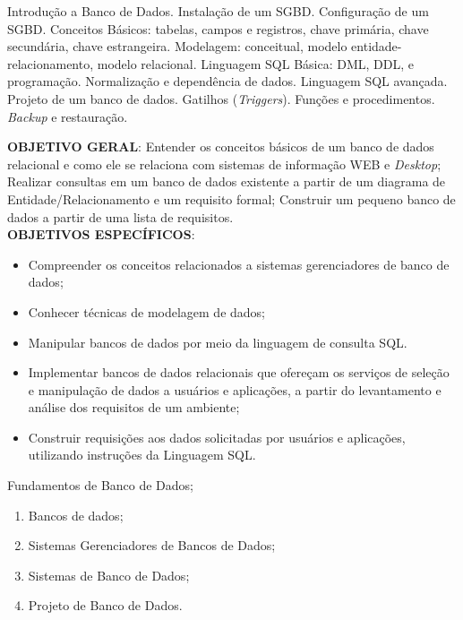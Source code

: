 
\begin{pud}

	
	
	\ementa
	Introdução a Banco de Dados. Instalação de um SGBD. Configuração de um SGBD. Conceitos Básicos: tabelas, campos e registros, chave primária, chave secundária, chave estrangeira. Modelagem: conceitual, modelo entidade-relacionamento, modelo relacional. Linguagem SQL Básica: DML, DDL, e programação. Normalização e dependência de dados. Linguagem SQL avançada. Projeto de um banco de dados. Gatilhos (\textit{Triggers}). Funções e procedimentos. \textit{Backup} e restauração.
	
	\objetivos
	\textbf{OBJETIVO GERAL}:
	Entender os conceitos básicos de um banco de dados relacional e como ele se relaciona com sistemas de informação WEB e \textit{Desktop}; Realizar consultas em um banco de dados existente a partir de um diagrama de Entidade/Relacionamento e um requisito formal; Construir um pequeno banco de dados a partir de uma lista de requisitos.	
	\newline\\	
	\textbf{OBJETIVOS ESPECÍFICOS}:
	\begin{itemize}
		\item Compreender os conceitos relacionados a sistemas gerenciadores de banco de dados;
		\item Conhecer técnicas de modelagem de dados;
		\item  Manipular bancos de dados por meio da linguagem de consulta SQL.
		\item  Implementar bancos de dados relacionais que ofereçam os serviços de seleção e manipulação de dados a usuários e aplicações, a partir do levantamento e análise dos requisitos de um ambiente;
		\item Construir requisições aos dados solicitadas por usuários e aplicações, utilizando instruções da Linguagem SQL.
	\end{itemize}
	
	
	\programa
	\begin{description}[itemsep=0em]
		\item[UNIDADE I:] Fundamentos de  Banco de Dados; 
	         \begin{enumerate}[itemsep=0em, topsep=0em]
                \item Bancos de dados;
                \item Sistemas Gerenciadores de Bancos de Dados;
                \item Sistemas de Banco de Dados;
                \item Projeto de Banco de Dados.
            \end{enumerate}
            

\end{description}
\end{pud}
